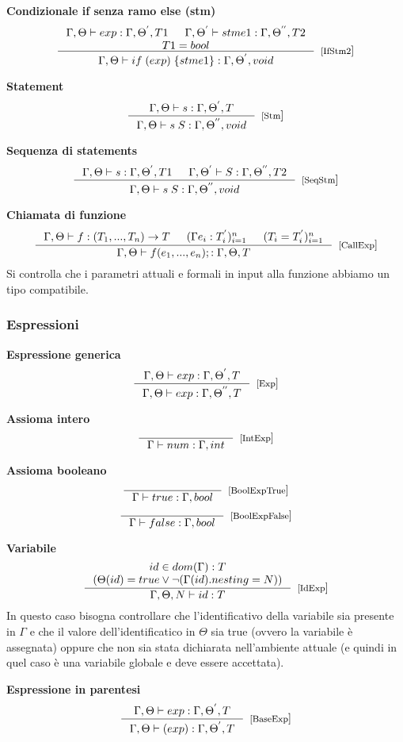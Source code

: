 \textbf{Condizionale if senza ramo else (stm)} 
\[
\inference{\Gamma, \Theta \vdash exp:\Gamma, \Theta^{'}, T1 & \Gamma, \Theta^{'} \vdash stme1:\Gamma, \Theta^{''}, T2 \\ T1 = bool}{\Gamma, \Theta \vdash if\; (exp)\; \{ stme1 \}: \Gamma, \Theta^{'}, void}[[IfStm2]]
\]

\textbf{Statement}
\[
\inference{\Gamma, \Theta \vdash s:\Gamma, \Theta^{'}, T }{\Gamma, \Theta \vdash s \; S: \Gamma, \Theta^{''}, void}[[Stm]]
\]

\textbf{Sequenza di statements}
\[
\inference{\Gamma, \Theta \vdash s:\Gamma, \Theta^{'}, T1 & \Gamma, \Theta^{'} \vdash S:\Gamma, \Theta^{''}, T2 }{\Gamma, \Theta \vdash s \; S: \Gamma, \Theta^{''}, void}[[SeqStm]]
\]

\textbf{Chiamata di funzione} 
\[
\inference{\Gamma, \Theta \vdash f: (T_{1}, ..., T_{n}) \rightarrow T & (\Gamma e_{i}: T^{'}_{i})^{n}_{i = 1} & (T_{i} = T^{'}_{i})^{n}_{i = 1}}{\Gamma, \Theta \vdash f(e_{1},...,e_{n});: \Gamma, \Theta, T}[[CallExp]]
\]
Si controlla che i parametri attuali e formali in input alla funzione abbiamo un tipo compatibile. \\

\subsubsection{Espressioni}

\textbf{Espressione generica}
\[
\inference{\Gamma, \Theta \vdash exp:\Gamma, \Theta^{'}, T}{\Gamma, \Theta \vdash exp: \Gamma, \Theta^{''}, T}[[Exp]]
\]

\textbf{Assioma intero} 
\[
\inference{}{\Gamma \vdash num: \Gamma, int}[[IntExp]]
\]

\textbf{Assioma booleano} 
\[
\inference{}{\Gamma \vdash true: \Gamma, bool}[[BoolExpTrue]]
\]
\[
\inference{}{\Gamma \vdash false: \Gamma, bool}[[BoolExpFalse]]
\]

\textbf{Variabile} 
\[
\inference{id \in dom(\Gamma): T \\ (\Theta(id) = true \lor \neg(\Gamma(id).nesting = N))}{\Gamma, \Theta, N \vdash id:  T}[[IdExp]]
\]
In questo caso bisogna controllare che l'identificativo della variabile sia presente in $\Gamma$ e che il valore dell'identificatico in $\Theta$ sia true (ovvero la variabile è assegnata) oppure che non sia stata dichiarata nell'ambiente attuale (e quindi in quel caso è una variabile globale e deve essere accettata). 

\textbf{Espressione in parentesi} 
\[
\inference{\Gamma, \Theta \vdash exp: \Gamma, \Theta^{'}, T}{\Gamma, \Theta \vdash (exp): \Gamma, \Theta^{'}, T}[[BaseExp]]
\]

